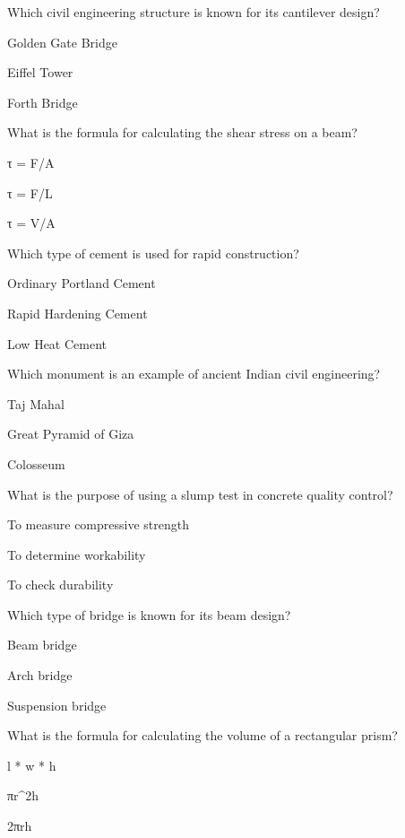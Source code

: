 \begin{enhancedmcq}{Which civil engineering structure is known for its cantilever design?}
\item Golden Gate Bridge
\item Eiffel Tower
\item Forth Bridge

\end{enhancedmcq}
\begin{enhancedmcq}{What is the formula for calculating the shear stress on a beam?}
\item τ = F/A
\item τ = F/L
\item τ = V/A

\end{enhancedmcq}
\begin{enhancedmcq}{Which type of cement is used for rapid construction?}
\item Ordinary Portland Cement
\item Rapid Hardening Cement
\item Low Heat Cement

\end{enhancedmcq}
\begin{enhancedmcq}{Which monument is an example of ancient Indian civil engineering?}
\item Taj Mahal
\item Great Pyramid of Giza
\item Colosseum

\end{enhancedmcq}
\begin{enhancedmcq}{What is the purpose of using a slump test in concrete quality control?}
\item To measure compressive strength
\item To determine workability
\item To check durability

\end{enhancedmcq}
\begin{enhancedmcq}{Which type of bridge is known for its beam design?}
\item Beam bridge
\item Arch bridge
\item Suspension bridge

\end{enhancedmcq}
\begin{enhancedmcq}{What is the formula for calculating the volume of a rectangular prism?}
\item l * w * h
\item πr^2h
\item 2πrh

\end{enhancedmcq}
